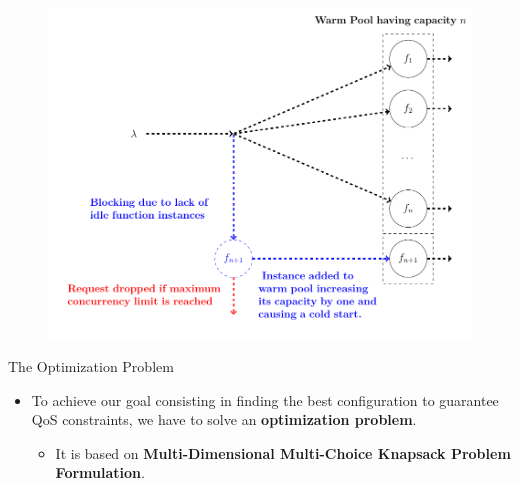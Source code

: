 \documentclass[13.5pt]{beamer}
\newcommand{\B}[1]{\textcolor{TorVergataColor}{\textbf{#1}}}
\begin{document}
\begin{frame}{}
	
\begin{figure}[h]
	\centering
	\includegraphics[width=\textwidth]{../Images/FaaSForSlide.png}
\end{figure}
	
\end{frame} 

\begin{frame}{The Optimization Problem}

\begin{itemize}
	\item To achieve our goal consisting in finding the best configuration to guarantee QoS constraints, we have to solve an \B{optimization problem}.
	\begin{itemize}
		\item It is based on \B{Multi-Dimensional Multi-Choice Knapsack Problem Formulation}. 
	\end{itemize}
\end{itemize}

\end{frame}
\end{document}
